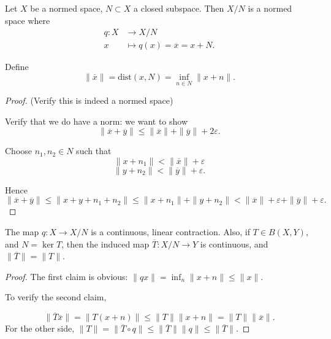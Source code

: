 \begin{definition}
	\label{defn:QuotientSpace}
	Let $X$ be a normed space, $N \subset X$ a closed subspace. Then $X / N$ is a normed space where 
	\begin{align*}
		q: X &\longrightarrow X/N  \\
		x &\longmapsto q(x) = \overline{x}  = x + N
	.\end{align*}

	Define
	\[
		\|\overline{x} \| = \text{dist}(x, N) = \inf _{n \in N} \|x + n\|
	.\] 
\end{definition}

\begin{proof}(Verify this is indeed a normed space)
	
Verify that we do have a norm: we want to show
\[
	\|\overline{x}  + \overline{y} \|\le \|\overline{x} \| + \|\overline{y} \| + 2 \varepsilon
.\] 

Choose $n_1, n_2 \in N$ such that
\[
	\|x + n_1\|< \|\overline{x} \| + \varepsilon
\] 
\[
	\|y + n_2\| < \|\overline{y} \| + \varepsilon
.\] 

Hence
\[
	\|\overline{x}  + \overline{y} \| \le \|x + y + n_1 + n_2\|
	\le \|x + n_1\| + \|y + n_2\| < \|\overline{x} \| + \varepsilon + \|\overline{y} \| + \varepsilon
.\] 
\end{proof}

\begin{proposition}
	\label{prop:QuotientMapContinuous}
	The map $q: X \to X / N$ is a continuous, linear contraction. Also, if $T \in B(X, Y)$, and $N = \operatorname{ker} T$, then the induced map $\overline{T} : X / N \to Y$ is continuous, and $\|\overline{T} \|= \|T\|$. 


\end{proposition}
\begin{proof}
	The first claim is obvious: $\|q x\| = \inf _n \|x + n\| \le \|x\|$.

	To verify the second claim,

	\[
		\|\overline{T}  \overline{x} \| = \|T (x + n)\| \le  \|T\| \| x + n\| = \|T\| \|\overline{x} \|
	.\] 
	For the other side, $\| T\| = \|\overline{T}  \circ q\| \le \|\overline{T} \| \|q\| \le \|\overline{T} \|$.
\end{proof}





